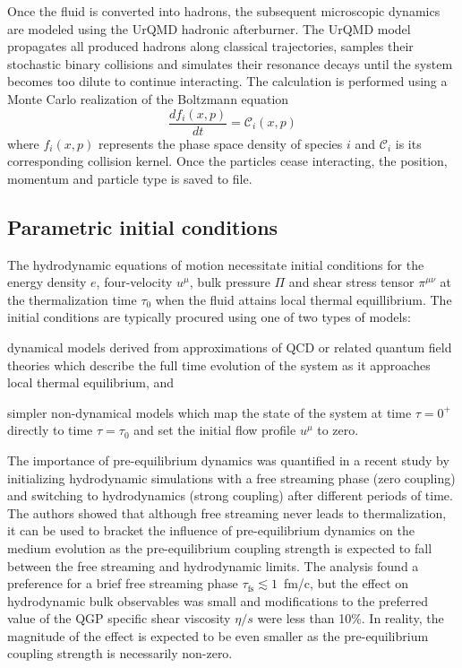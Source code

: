 \documentclass[aps,prc,reprint,amsmath,nofootinbib]{revtex4-1}
\begin{document}
Once the fluid is converted into hadrons, the subsequent microscopic dynamics are modeled using the UrQMD hadronic afterburner.
The UrQMD model propagates all produced hadrons along classical trajectories, samples their stochastic binary collisions and simulates their resonance decays until the system becomes too dilute to continue interacting.
The calculation is performed using a Monte Carlo realization of the Boltzmann equation
\begin{equation}
    \frac{df_i(x,p)}{dt} = \mathcal{C}_i(x, p)
\end{equation}
where $f_i(x,p)$ represents the phase space density of species $i$ and $\mathcal{C}_i$ is its corresponding collision kernel.
Once the particles cease interacting, the position, momentum and particle type is saved to file.


\subsection{Parametric initial conditions}

The hydrodynamic equations of motion necessitate initial conditions for the energy density $e$, four-velocity $u^\mu$, bulk pressure $\Pi$ and shear stress tensor $\pi^{\mu\nu}$ at the thermalization time $\tau_0$ when the fluid attains local thermal equillibrium. The initial conditions are typically procured using one of two types of models:
\begin{enumerate*}[label={\arabic*)}]
    \item dynamical models derived from approximations of QCD or related quantum field theories which describe the full time evolution of the system as it approaches local thermal equilibrium, and 
    \item simpler non-dynamical models which map the state of the system at time $\tau=0^+$ directly to time $\tau=\tau_0$ and set the initial flow profile $u^\mu$ to zero.
\end{enumerate*}

The importance of pre-equilibrium dynamics was quantified in a recent study by initializing hydrodynamic simulations with a free streaming phase (zero coupling) and switching to hydrodynamics (strong coupling) after different periods of time. The authors showed that although free streaming never leads to thermalization, it can be used to bracket the influence of pre-equilibrium dynamics on the medium evolution as the pre-equilibrium coupling strength is expected to fall between the free streaming and hydrodynamic limits. The analysis found a preference for a brief free streaming phase ${\tau_\text{fs} \lesssim 1}$~fm/c, but the effect on hydrodynamic bulk observables was small and modifications to the preferred value of the QGP specific shear viscosity $\eta/s$ were less than 10\%. In reality, the magnitude of the effect is expected to be even smaller as the pre-equilibrium coupling strength is necessarily non-zero.
\end{document}
